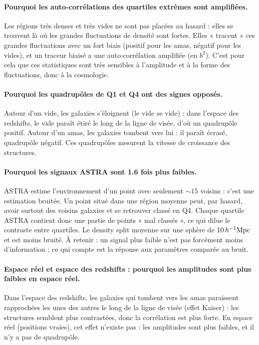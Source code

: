 \paragraph{Pourquoi les auto-corrélations des quartiles extrêmes sont amplifiées.} Les régions très denses et très vides ne sont pas placées au hasard : elles se trouvent là où les grandes fluctuations de densité sont fortes. Elles « tracent » ces grandes fluctuations avec un fort biais (positif pour les amas, négatif pour les vides), et un traceur biaisé a une auto-corrélation amplifiée (en $b^2$). C'est pour cela que ces statistiques sont très sensibles à l'amplitude et à la forme des fluctuations, donc à la cosmologie.

\paragraph{Pourquoi les quadrupôles de Q1 et Q4 ont des signes opposés.} Autour d'un vide, les galaxies s'éloignent (le vide se vide) : dans l'espace des redshifts, le vide paraît étiré le long de la ligne de visée, d'où un quadrupôle positif. Autour d'un amas, les galaxies tombent vers lui : il paraît écrasé, quadrupôle négatif. Ces quadrupôles mesurent la vitesse de croissance des structures.

\paragraph{Pourquoi les signaux ASTRA sont 1.6 fois plus faibles.} ASTRA estime l'environnement d'un point avec seulement $\sim15$ voisins : c'est une estimation bruitée. Un point situé dans une région moyenne peut, par hasard, avoir surtout des voisins galaxies et se retrouver classé en Q4. Chaque quartile ASTRA contient donc une partie de points « mal classés », ce qui dilue le contraste entre quartiles. Le density split moyenne sur une sphère de $10\,h^{-1}\mathrm{Mpc}$ et est moins bruité. À retenir : un signal plus faible n'est pas forcément moins d'information ; ce qui compte est la réponse aux paramètres comparée au bruit.

\paragraph{Espace réel et espace des redshifts : pourquoi les amplitudes sont plus faibles en espace réel.} Dans l'espace des redshifts, les galaxies qui tombent vers les amas paraissent rapprochées les unes des autres le long de la ligne de visée (effet Kaiser) : les structures semblent plus contrastées, donc la corrélation est plus forte. En espace réel (positions vraies), cet effet n'existe pas : les amplitudes sont plus faibles, et il n'y a pas de quadrupôle.

